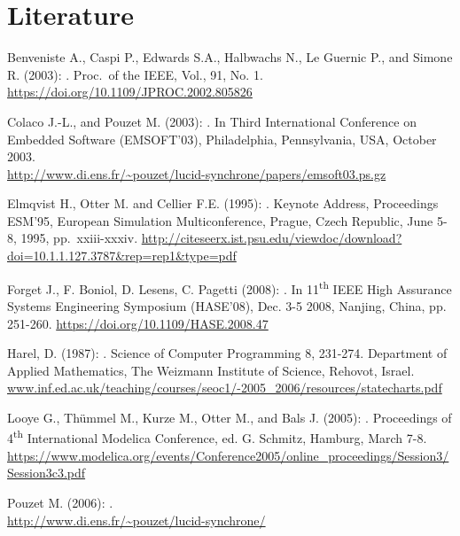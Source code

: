 \chapter{Literature}

Benveniste A., Caspi P., Edwards S.A., Halbwachs N., Le Guernic P., and Simone R. (2003):
.
Proc.\ of the IEEE, Vol., 91, No. 1.
\url{https://doi.org/10.1109/JPROC.2002.805826}

Colaco J.-L., and Pouzet M. (2003):
.
In Third International Conference on Embedded Software (EMSOFT'03), Philadelphia, Pennsylvania, USA, October 2003.\\
\url{http://www.di.ens.fr/~pouzet/lucid-synchrone/papers/emsoft03.ps.gz}

Elmqvist H., Otter M. and Cellier F.E. (1995):
.
Keynote Address, Proceedings ESM'95, European Simulation Multiconference, Prague, Czech Republic, June 5-8, 1995, pp.\ xxiii-xxxiv.
\url{http://citeseerx.ist.psu.edu/viewdoc/download?doi=10.1.1.127.3787\&rep=rep1\&type=pdf}

Forget J., F. Boniol, D. Lesens, C. Pagetti (2008):
.
In 11\textsuperscript{th} IEEE High Assurance Systems Engineering Symposium (HASE'08), Dec. 3-5 2008, Nanjing, China, pp. 251-260.
\url{https://doi.org/10.1109/HASE.2008.47}

Harel, D. (1987):
.
Science of Computer Programming 8, 231-274. Department of Applied Mathematics, The Weizmann Institute of Science, Rehovot, Israel.
\href{http://www.inf.ed.ac.uk/teaching/courses/seoc1/2005_2006/resources/statecharts.pdf}{www.inf.ed.ac.uk/teaching/courses/seoc1/-2005\_2006/resources/statecharts.pdf}

Looye G., Thümmel M., Kurze M., Otter M., and Bals J. (2005):
.
Proceedings of 4\textsuperscript{th} International Modelica Conference, ed. G. Schmitz, Hamburg, March 7-8.\\
\url{https://www.modelica.org/events/Conference2005/online_proceedings/Session3/Session3c3.pdf}

Pouzet M. (2006):
.\\
\url{http://www.di.ens.fr/~pouzet/lucid-synchrone/}
